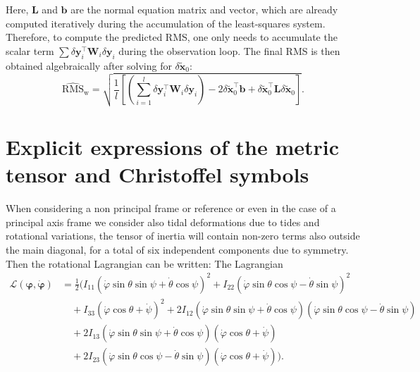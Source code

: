 \documentclass[pdflatex,sn-mathphys-num]{sn-jnl}%
\theoremstyle{thmstyleone}%
\theoremstyle{thmstyletwo}%
\theoremstyle{thmstylethree}%
\renewcommand{\vec}[1]{\boldsymbol{#1}}
\begin{document}
\begin{appendices}
Here, $\vec{L}$ and $\vec{b}$ are the normal equation matrix and vector, which are already computed iteratively during the accumulation of the least-squares system. Therefore, to compute the predicted RMS, one only needs to accumulate the scalar term $\sum \delta\vec{y}_i^\top \vec{W}_i \delta\vec{y}_i$ during the observation loop. The final RMS is then obtained algebraically after solving for $\delta\tilde{\vec{x}}_0$:
\begin{equation}
	\widehat{\mathrm{RMS}}_{\mathrm{w}} = \sqrt{\frac{1}{l} \left[ \left(\sum_{i=1}^{l} \delta\vec{y}_i^\top \vec{W}_i \delta\vec{y}_i\right) - 2 \delta\tilde{\vec{x}}_0^\top \vec{b} + \delta\tilde{\vec{x}}_0^\top \vec{L} \delta\tilde{\vec{x}}_0 \right]}.
\end{equation}
		

\section[Explicit expressions]{Explicit expressions of the metric tensor and Christoffel symbols}
\label{sec:metric_tensor_christoffel_off_diagonal}

When considering a non principal frame or reference or even in the case of a principal axis frame we consider also tidal deformations due to tides and rotational variations, the tensor of inertia will contain non-zero terms also outside the main diagonal, for a total of six independent components due to symmetry. Then the rotational Lagrangian can be written: 
The Lagrangian 
\begin{align}
	\mathcal{L}(\vec{\varphi} , \dot{\vec{\varphi}})  &= \frac{1}{2} \Bigg( 
	I_{11} \left( \dot{\varphi} \sin \theta \sin \psi + \dot{\theta} \cos \psi \right)^2
	+ I_{22} \left( \dot{\varphi} \sin \theta \cos \psi - \dot{\theta} \sin \psi \right)^2 \nonumber \\
	&\quad 
	+ I_{33} \left( \dot{\varphi} \cos \theta + \dot{\psi} \right)^2 + 2 I_{12} \left( \dot{\varphi} \sin \theta \sin \psi + \dot{\theta} \cos \psi \right) 
	\left( \dot{\varphi} \sin \theta \cos \psi - \dot{\theta} \sin \psi \right) 
	\nonumber \\
	&\quad 
	+ 2 I_{13} \left( \dot{\varphi} \sin \theta \sin \psi + \dot{\theta} \cos \psi \right) 
	\left( \dot{\varphi} \cos \theta + \dot{\psi} \right) 
	\nonumber \\
	&\quad 
	+ 2 I_{23} \left( \dot{\varphi} \sin \theta \cos \psi - \dot{\theta} \sin \psi \right) 
	\left( \dot{\varphi} \cos \theta + \dot{\psi} \right) 
	\Bigg).
\end{align}



\end{appendices}
\end{document}
